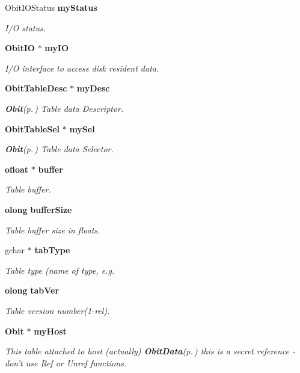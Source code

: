 \begin{CompactItemize}
Obit\-IOStatus {\bf my\-Status}
\begin{CompactList}\small\item\em I/O status. \item\end{CompactList}\item 
{\bf Obit\-IO} $\ast$ {\bf my\-IO}
\begin{CompactList}\small\item\em I/O interface to access disk resident data. \item\end{CompactList}\item 
{\bf Obit\-Table\-Desc} $\ast$ {\bf my\-Desc}
\begin{CompactList}\small\item\em {\bf Obit}{\rm (p.\,\pageref{structObit})} Table data Descriptor. \item\end{CompactList}\item 
{\bf Obit\-Table\-Sel} $\ast$ {\bf my\-Sel}
\begin{CompactList}\small\item\em {\bf Obit}{\rm (p.\,\pageref{structObit})} Table data Selector. \item\end{CompactList}\item 
{\bf ofloat} $\ast$ {\bf buffer}
\begin{CompactList}\small\item\em Table buffer. \item\end{CompactList}\item 
{\bf olong} {\bf buffer\-Size}
\begin{CompactList}\small\item\em Table buffer size in floats. \item\end{CompactList}\item 
gchar $\ast$ {\bf tab\-Type}
\begin{CompactList}\small\item\em Table type (name of type, e.g. \item\end{CompactList}\item 
{\bf olong} {\bf tab\-Ver}
\begin{CompactList}\small\item\em Table version number(1-rel). \item\end{CompactList}\item 
{\bf Obit} $\ast$ {\bf my\-Host}
\begin{CompactList}\small\item\em This table attached to host (actually) {\bf Obit\-Data}{\rm (p.\,\pageref{structObitData})} this is a secret reference - don't use Ref or Unref functions. \item\end{CompactList}\end{CompactItemize}


